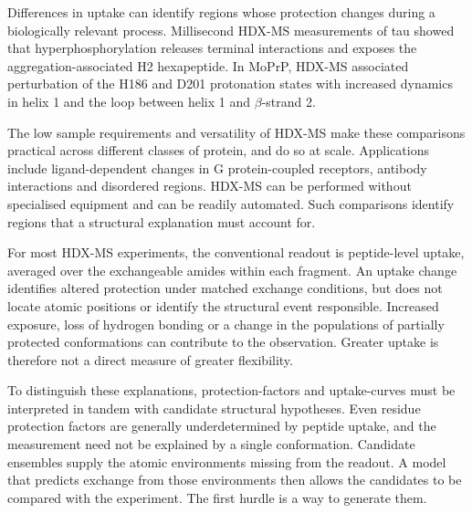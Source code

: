 Differences in uptake can identify regions whose protection changes during a biologically relevant process. Millisecond HDX-MS measurements of tau showed that hyperphosphorylation releases terminal interactions and exposes the aggregation-associated H2 hexapeptide.\supercite{narangHDXMSAnalyticalTool2020} In MoPrP, HDX-MS associated perturbation of the H186 and D201 protonation states with increased dynamics in helix 1 and the loop between helix 1 and $\beta$-strand 2.\supercite{singhUnravelingMolecularMechanism2016}

The low sample requirements and versatility of HDX-MS make these comparisons practical across different classes of protein, and do so at scale.\supercite{narangHDXMSAnalyticalTool2020} Applications include ligand-dependent changes in G protein-coupled receptors,\supercite{westLigandDependentPerturbationConformational2011} antibody interactions\supercite{andersonHDXMSMDSimulations2022} and disordered regions.\supercite{mitraEmergingRoleMass2021} HDX-MS can be performed without specialised equipment and can be readily automated. Such comparisons identify regions that a structural explanation must account for.

For most HDX-MS experiments, the conventional readout is peptide-level uptake, averaged over the exchangeable amides within each fragment.\supercite{leeInterpretingHydrogenDeuteriumExchange2021} An uptake change identifies altered protection under matched exchange conditions, but does not locate atomic positions or identify the structural event responsible.\supercite{massonRecommendationsPerformingInterpreting2019} Increased exposure, loss of hydrogen bonding or a change in the populations of partially protected conformations can contribute to the observation. Greater uptake is therefore not a direct measure of greater flexibility.

To distinguish these explanations, protection-factors and uptake-curves must be interpreted in tandem with candidate structural hypotheses. Even residue protection factors are generally underdetermined by peptide uptake,\supercite{skinnerEstimatingConstraintsProtection2019} and the measurement need not be explained by a single conformation.\supercite{bradshawInterpretationHDXData2020} Candidate ensembles supply the atomic environments missing from the readout. A model that predicts exchange from those environments then allows the candidates to be compared with the experiment. The first hurdle is a way to generate them.


